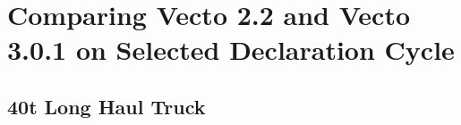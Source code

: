 



\section{Comparing Vecto 2.2 and Vecto 3.0.1 on Selected Declaration Cycle} %
\label{sec:comparison_of_vecto_2_2_and_vecto_3_0_1_on_the_declaration_cycle}


\subsection{40t Long Haul Truck} %
\label{sub:40t_long_haul_truck}




